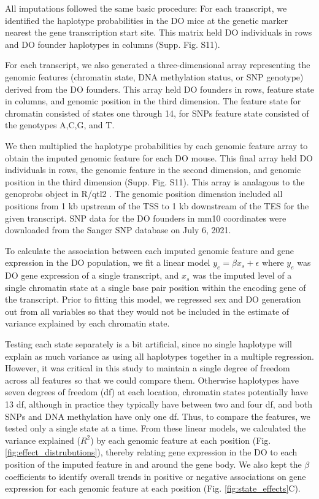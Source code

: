 \documentclass[
  11pt,
]{article}
\begin{document}
All imputations followed the same basic procedure: For each transcript,
we identified the haplotype probabilities in the DO mice at the genetic
marker nearest the gene transcription start site. This matrix held DO
individuals in rows and DO founder haplotypes in columns (Supp. Fig.
S11).

For each transcript, we also generated a three-dimensional array
representing the genomic features (chromatin state, DNA methylation
status, or SNP genotype) derived from the DO founders. This array held
DO founders in rows, feature state in columns, and genomic position in
the third dimension. The feature state for chromatin consisted of states
one through 14, for SNPs feature state consisted of the genotypes A,C,G,
and T.

We then multiplied the haplotype probabilities by each genomic feature
array to obtain the imputed genomic feature for each DO mouse. This
final array held DO individuals in rows, the genomic feature in the
second dimension, and genomic position in the third dimension (Supp.
Fig. S11). This array is analagous to the genoprobs object in R/qtl2
\citep{pmid30591514}. The genomic position dimension included all
positions from 1 kb upstream of the TSS to 1 kb downstream of the TES
for the given transcript. SNP data for the DO founders in mm10
coordinates were downloaded from the Sanger SNP database
\citep{keane2011mouse} on July 6, 2021.

To calculate the association between each imputed genomic feature and
gene expression in the DO population, we fit a linear model
\(y_{e} = \beta x_{s} + \epsilon\) where \(y_{e}\) was DO gene
expression of a single transcript, and \(x_{s}\) was the imputed level
of a single chromatin state at a single base pair position within the
encoding gene of the transcript. Prior to fitting this model, we
regressed sex and DO generation out from all variables so that they
would not be included in the estimate of variance explained by each
chromatin state.

Testing each state separately is a bit artificial, since no single
haplotype will explain as much variance as using all haplotypes together
in a multiple regression. However, it was critical in this study to
maintain a single degree of freedom across all features so that we could
compare them. Otherwise haplotypes have seven degrees of freedom (df) at
each location, chromatin states potentially have 13 df, although in
practice they typically have between two and four df, and both SNPs and
DNA methylation have only one df. Thus, to compare the features, we
tested only a single state at a time. From these linear models, we
calculated the variance explained (\(R^2\)) by each genomic feature at
each position (Fig. \ref{fig:effect_distrubutions}), thereby relating
gene expression in the DO to each position of the imputed feature in and
around the gene body. We also kept the \(\beta\) coefficients to
identify overall trends in positive or negative associations on gene
expression for each genomic feature at each position (Fig.
\ref{fig:state_effects}C).
\end{document}

